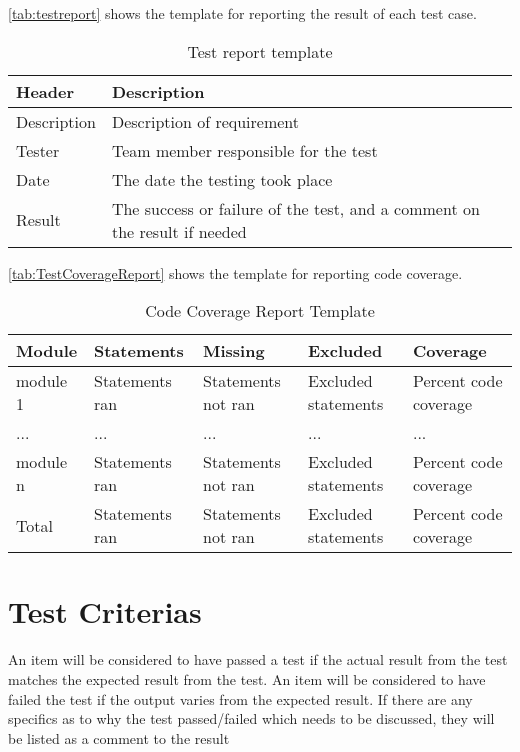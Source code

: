 \autoref{tab:testreport} shows the template for reporting the result of each test case.

\begin{table}[htb] \small \center
\caption{Test report template \label{tab:testreport}}
\begin{tabular}{l l}
	\toprule
	Header & Description \\
	\midrule
	Description & Description of requirement \\
	Tester & Team member responsible for the test \\
	Date & The date the testing took place \\
	Result & The success or failure of the test, and a comment on the result if needed \\
	\bottomrule
\end{tabular}
\end{table}

\autoref{tab:TestCoverageReport} shows the template for reporting code coverage.

\begin{table}[!htb]\footnotesize\center
	\caption{Code Coverage Report Template\label{tab:TestCoverageReport}}
	\begin{tabular}{l l l l l}
		\toprule
		Module & Statements & Missing & Excluded & Coverage\\
		\midrule
		module 1 & Statements ran & Statements not ran  & Excluded statements & Percent code coverage\ \\
		... & ... & ... & ... & ... \\
		module n & Statements ran & Statements not ran & Excluded statements  & Percent code coverage \\
		\bottomrule
		Total & Statements ran & Statements not ran & Excluded statements & Percent code coverage \\
		\bottomrule
	\end{tabular}
\end{table}


\section{Test Criterias}
An item will be considered to have passed a test if the actual result from the test matches the expected result from the test. An item will be considered to have failed the test if the output varies from the expected result. If there are any specifics as to why the test passed/failed which needs to be discussed, they will be listed as a comment to the result


